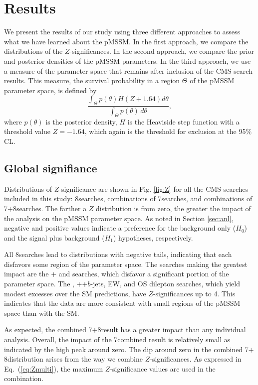 \section{Results}
\label{sec:results}

We present the results of our study using three
different approaches to assess what we have learned about the pMSSM.  In the first approach, we compare the distributions of the $Z$-significances.
In the second approach, we compare the prior and posterior densities of the pMSSM parameters.
In the third approach, we use a measure of the parameter space that remains after inclusion of the CMS search results.  This measure, the survival probability in a region $\Theta$ of the pMSSM parameter space, is defined by
\begin{equation}
  \frac{\int_\Theta p(\theta)H(Z + 1.64)d\theta}{\int_\Theta p(\theta) \, d\theta},
\end{equation}
where $p(\theta)$ is the posterior density, $H$ is the
Heaviside step function with a threshold value $Z = -1.64$, which
again is the threshold for exclusion at the 95\% CL. 

\subsection{Global signifiance}
Distributions of $Z$-significance are shown in Fig. \ref{fig:Z} for all the CMS
searches included in this study: 8\TeV searches, combinations of 7\TeV searches, and combinations of
7$+$8\TeV searches. The farther a $Z$ distribution is from zero, the
greater the impact of the analysis on the pMSSM parameter space.   As
noted in Section \ref{sec:anl}, negative and positive values indicate a preference for the background only ($H_0$) and the signal plus background ($H_1$) hypotheses, respectively.

All 8\TeV searches lead to distributions with negative tails,
indicating that each disfavors some region of the parameter space.
The searches making the greatest impact are the \HT{}$+$\MHT{} and \MTtwo{}
searches, which disfavor a significant portion of the parameter space.
The \MTtwo{}, \HT{}$+$\MET{}$+b$-jets, EW, and OS dilepton searches,
which yield modest excesses over the SM predictions, have
$Z$-significances up to 4. This indicates that
the data are more consistent with small regions of the pMSSM space than with the SM.

As expected, the combined 7$+$8\TeV result has a greater impact than any individual analysis. 
Overall, the impact of the 7\TeV combined result is relatively small as indicated by the high peak around zero.  The dip around zero in the combined 7$+$8\TeV distribution arises from the way we combine $Z$-significances. As expressed in Eq.~(\ref{eq:Zmulti}), the maximum $Z$-significance values are used in the combination.


